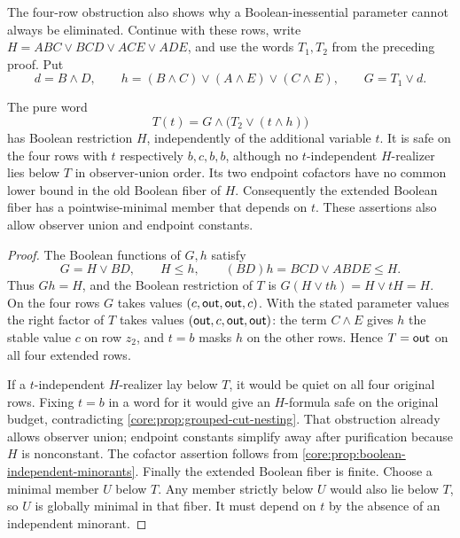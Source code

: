 The four-row obstruction also shows why a Boolean-inessential parameter
cannot always be eliminated. Continue with these rows, write
$H=ABC\vee BCD\vee ACE\vee ADE$, and use the words $T_1,T_2$ from
the preceding proof. Put
\[
 d=B\wedge D,\qquad
 h=(B\wedge C)\vee(A\wedge E)\vee(C\wedge E),\qquad
 G=T_1\vee d.
\]

\begin{proposition}
\label{core:prop:inessential-parameter-minimal}
The pure word
\[
 T(t)=G\wedge\bigl(T_2\vee(t\wedge h)\bigr)
\]
has Boolean restriction $H$, independently of the additional variable $t$.
It is safe on the four rows with $t$ respectively $b,c,b,b$, although
no $t$-independent $H$-realizer lies below $T$ in observer-union order.
Its two endpoint cofactors have no common lower bound in the old
Boolean fiber of $H$.
Consequently the extended Boolean fiber has a pointwise-minimal member
that depends on $t$. These assertions also allow observer union and
endpoint constants.
\end{proposition}
\begin{proof}
The Boolean functions of $G,h$ satisfy
\[
 G=H\vee BD,\qquad H\leq h,\qquad
 (BD)h=BCD\vee ABDE\leq H.
\]
Thus $Gh=H$, and the Boolean restriction of $T$ is
$G(H\vee th)=H\vee tH=H$.
On the four rows $G$ takes values $(c,\mathsf{out},\mathsf{out},c)$.
With the stated parameter values the right factor of $T$ takes values
$(\mathsf{out},c,\mathsf{out},\mathsf{out})$: the term $C\wedge E$ gives $h$ the stable value
$c$ on row $z_2$, and $t=b$ masks $h$ on the other rows.
Hence $T=\mathsf{out}$ on all four extended rows.

If a $t$-independent $H$-realizer lay below $T$, it would be quiet on
all four original rows. Fixing $t=b$ in a word for it would give an
$H$-formula safe on the original budget, contradicting
\cref{core:prop:grouped-cut-nesting}. That obstruction already allows
observer union; endpoint constants simplify away after purification
because $H$ is nonconstant.
The cofactor assertion follows from
\cref{core:prop:boolean-independent-minorants}.
Finally the extended Boolean fiber is finite. Choose a minimal member
$U$ below $T$. Any member strictly below $U$ would also lie below $T$,
so $U$ is globally minimal in that fiber. It must depend on $t$ by the
absence of an independent minorant.
\end{proof}
